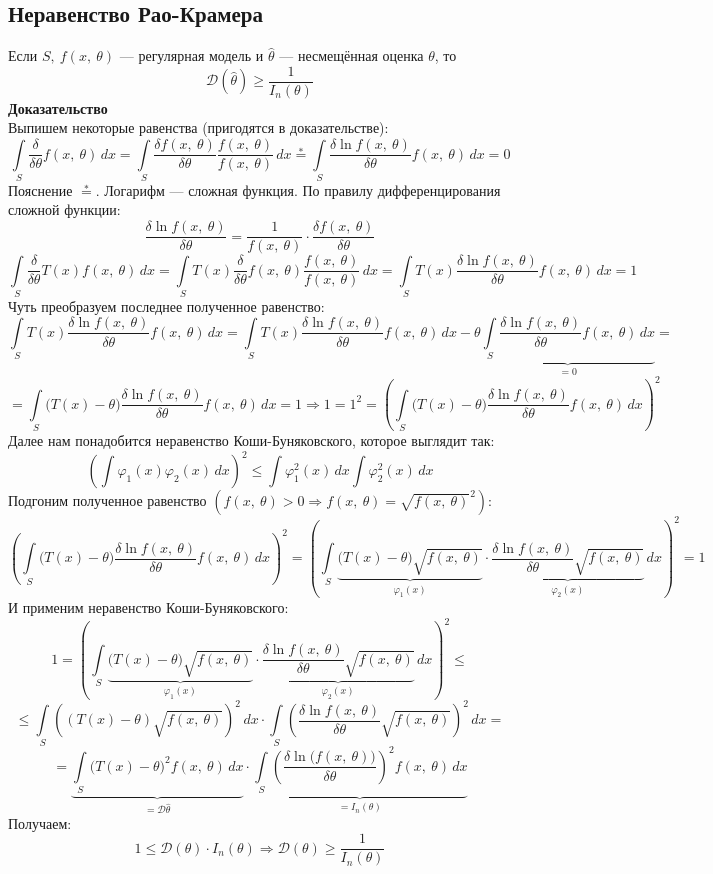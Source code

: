 \documentclass[12pt, a4paper]{article}
\newcommand{\dev}{\mathcal{D}}
\begin{document}
\subsection*{Неравенство Рао-Крамера}
Если $S,\ f(x,\ \theta)$ --- регулярная модель и $\hat{\theta}$ --- несмещённая оценка $\theta$, то 
\[\dev (\hat{\theta}) \geq \frac{1}{I_n(\theta)}\]
\textbf{Доказательство}\\
Выпишем некоторые равенства (пригодятся в доказательстве):
\[\int\limits_S \frac{\delta}{\delta \theta} f(x,\ \theta)\, dx = \int\limits_S \frac{\delta f(x,\ \theta)}{\delta \theta} \frac{f(x,\ \theta)}{f(x,\ \theta)}\, dx \overset{*}{=} \int\limits_S \frac{\delta \ln f(x,\ \theta)}{\delta \theta} f(x,\ \theta)\, dx = 0\]
Пояснение $\overset{*}{=}$. Логарифм --- сложная функция. По правилу дифференцирования сложной функции:
\[\frac{\delta \ln f(x,\ \theta)}{\delta \theta} = \frac{1}{f(x,\ \theta)} \cdot \frac{\delta f(x,\ \theta)}{\delta \theta}\]
\[\int\limits_S \frac{\delta}{\delta \theta} T(x) f(x,\ \theta)\, dx = \int\limits_S T(x) \frac{\delta}{\delta \theta} f(x,\ \theta) \frac{f(x,\ \theta)}{f(x,\ \theta)}\, dx = \int\limits_S T(x) \frac{\delta \ln f(x,\ \theta)}{\delta \theta} f(x,\ \theta)\, dx = 1\]
Чуть преобразуем последнее полученное равенство:
\[\int\limits_S T(x) \frac{\delta \ln f(x,\ \theta)}{\delta \theta} f(x,\ \theta)\, dx = \int\limits_S T(x) \frac{\delta \ln f(x,\ \theta)}{\delta \theta} f(x,\ \theta)\, dx - \theta\underset{=0}{\underbrace{\int\limits_S \frac{\delta \ln f(x,\ \theta)}{\delta \theta} f(x,\ \theta)\, dx}} = \]
\[= \int\limits_S \big( T(x) - \theta \big) \frac{\delta \ln f(x,\ \theta)}{\delta \theta} f(x,\ \theta)\, dx = 1 \Rightarrow 1 = 1^2 = \left( \int\limits_S \big( T(x) - \theta \big) \frac{\delta \ln f(x,\ \theta)}{\delta \theta} f(x,\ \theta)\, dx \right)^2 \]
Далее нам понадобится неравенство Коши-Буняковского, которое выглядит так:
\[\left( \int \varphi_1(x)\varphi_2(x)\, dx \right)^2 \leq \int \varphi_1^2(x)\, dx\int \varphi_2^2(x)\, dx\]
Подгоним полученное равенство $\left(f(x,\ \theta) > 0 \Rightarrow f(x,\ \theta) = \sqrt{f(x,\ \theta)}^2\right)$:
\[\left( \int\limits_S \big( T(x) - \theta \big) \frac{\delta \ln f(x,\ \theta)}{\delta \theta} f(x,\ \theta)\, dx \right)^2 = \left( \int\limits_S \underset{\varphi_1(x)}{\underbrace{\big( T(x) - \theta \big) \sqrt{f(x,\ \theta)}}}\cdot\underset{\varphi_2(x)}{\underbrace{\frac{\delta \ln f(x,\ \theta)}{\delta \theta} \sqrt{f(x,\ \theta)}}}\, dx \right)^2 = 1\]
И применим неравенство Коши-Буняковского:
\[1 = \left( \int\limits_S \underset{\varphi_1(x)}{\underbrace{\big( T(x) - \theta \big) \sqrt{f(x,\ \theta)}}}\cdot\underset{\varphi_2(x)}{\underbrace{\frac{\delta \ln f(x,\ \theta)}{\delta \theta} \sqrt{f(x,\ \theta)}}}\, dx \right)^2 \leq\]
\[\leq \int\limits_S \left( (T(x) - \theta)\sqrt{f(x,\ \theta)} \right)^2 \, dx \cdot \int\limits_S \left( \frac{\delta \ln f(x,\ \theta)}{\delta \theta} \sqrt{f(x,\ \theta)} \right)^2 \, dx =\]
\[= \underset{=\dev\hat{\theta}}{\underbrace{\int\limits_S \big( T(x) - \theta \big)^2 f(x,\ \theta)\, dx}} \cdot \underset{=I_n(\theta)}{\underbrace{\int\limits_S\left( \frac{\delta \ln \big(f(x,\ \theta)\big)}{\delta \theta} \right)^2 f(x,\ \theta)\, dx}}\]
Получаем:
\[1 \leq \dev (\theta) \cdot I_n(\theta)\Rightarrow \dev (\theta) \geq \frac{1}{I_n(\theta)}\]
\end{document}
